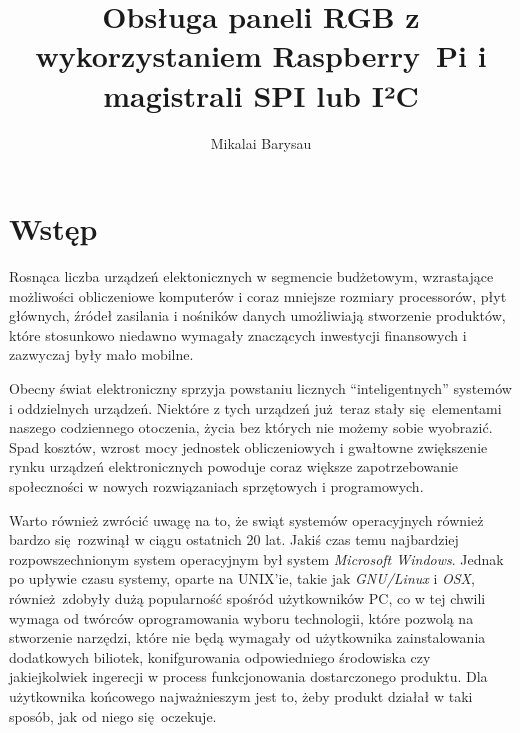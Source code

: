 \documentclass[eng,printmode]{mgr}
\title{Obsługa paneli RGB z wykorzystaniem Raspberry~Pi i magistrali SPI lub I²C}
\author{Mikalai Barysau}
\begin{document}

\maketitle

\tableofcontents %

\chapter*{Wstęp}

Rosnąca liczba urządzeń elektonicznych w segmencie budżetowym, wzrastające możliwości obliczeniowe komputerów i coraz mniejsze rozmiary processorów, płyt głównych, źródeł zasilania i nośników danych umożliwiają stworzenie produktów, które stosunkowo niedawno wymagały znaczących inwestycji finansowych i zazwyczaj były mało mobilne. 

Obecny świat elektroniczny sprzyja powstaniu licznych ``inteligentnych'' systemów i oddzielnych urządzeń. Niektóre z tych urządzeń już teraz stały się elementami naszego codziennego otoczenia, życia bez których nie możemy sobie wyobrazić. Spad kosztów, wzrost mocy jednostek obliczeniowych i gwałtowne zwiększenie rynku urządzeń elektronicznych powoduje coraz większe zapotrzebowanie społeczności w nowych rozwiązaniach sprzętowych i programowych. 

Warto również zwrócić uwagę na to, że swiąt systemów operacyjnych również bardzo się rozwinął w ciągu ostatnich 20 lat. Jakiś czas temu najbardziej rozpowszechnionym system operacyjnym był system \emph{Microsoft Windows}. Jednak po upływie czasu systemy, oparte na UNIX'ie, takie jak \emph{GNU/Linux} i \emph{OSX}, również zdobyły dużą popularność spośród użytkowników PC, co w tej chwili wymaga od twórców oprogramowania wyboru technologii, które pozwolą na stworzenie narzędzi, które nie będą wymagały od użytkownika zainstalowania dodatkowych biliotek, konifgurowania odpowiedniego środowiska czy jakiejkolwiek ingerecji w process funkcjonowania dostarczonego produktu. Dla użytkownika końcowego najważnieszym jest to, żeby produkt działał w taki sposób, jak od niego się oczekuje. 
\end{document}
